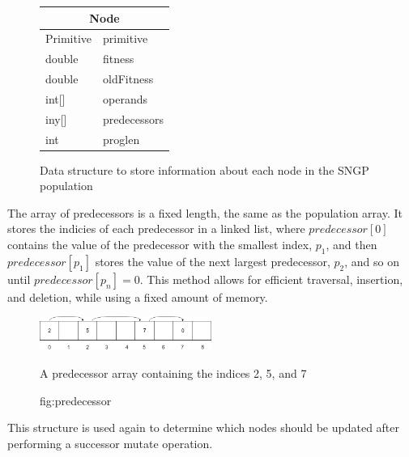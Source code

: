 \documentclass{article}
\begin{document}
        \begin{figure}[H]
            \centering
            \begin{tabular}{|l l|}
                \hline
                \multicolumn{2}{|c|}{Node}\\
                \hline
                Primitive & primitive \\
                double & fitness\\
                double & oldFitness\\
                int[] & operands\\
                iny[] & predecessors\\
                int & proglen\\
                \hline
            \end{tabular}
            \caption{Data structure to store information about each node in the SNGP population}
            
            \label{struct:sngp_node}
        \end{figure}
        
        The array of predecessors is a fixed length, the same as the population array. It stores the indicies of each predecessor in a linked list, where $predecessor[0]$ contains the value of the predecessor with the smallest index, $p_1$, and then $predecessor[p_1]$ stores the value of the next largest predecessor, $p_2$, and so on until $predecessor[p_n] = 0$. This method allows for efficient traversal, insertion, and deletion, while using a fixed amount of memory.
        
        \begin{figure}[h]
        	
        	\centering
        	\includegraphics[width=0.5\textwidth]{predecessor_array}
        	\caption{A predecessor array containing the indices 2, 5, and 7}
        	\caption{fig:predecessor}
        	
        \end{figure}
    
    	This structure is used again to determine which nodes should be updated after performing a successor mutate operation.
    	
\end{document}
